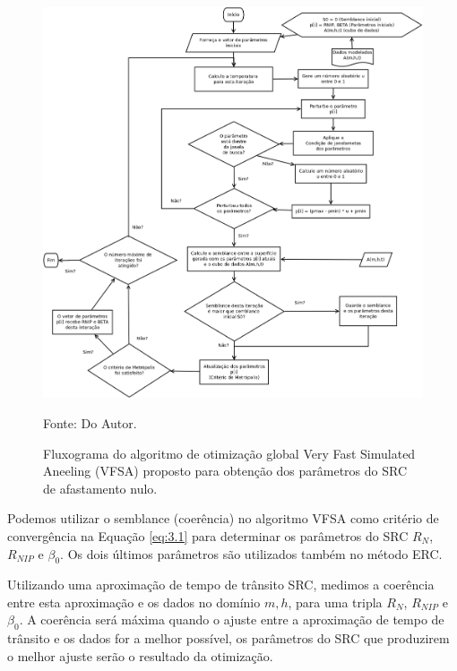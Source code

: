 \begin{figure}[htb]
\caption{Fluxograma do algoritmo de otimização global Very Fast Simulated Aneeling (VFSA)
proposto para obtenção dos parâmetros do SRC de afastamento nulo.}
\begin{center}
\includegraphics[scale=0.45]{images/VFSA.png}
\vspace{-0.3cm}
\end{center}
\begin{center}
 Fonte: Do Autor.
\end{center}
\label{fig:3.1}
\end{figure}

Podemos utilizar o semblance (coerência) no algoritmo VFSA como critério de convergência na Equação \ref{eq:3.1}
para determinar os parâmetros do SRC $R_N$, $R_{NIP}$ e $\beta_0$. Os dois últimos parâmetros são utilizados também 
no método ERC.

Utilizando uma aproximação de tempo de trânsito SRC, medimos a coerência entre esta aproximação e os
dados no domínio $m, h$, para uma tripla $R_N$, $R_{NIP}$ e $\beta_0$.
A coerência será máxima quando o ajuste entre a aproximação de tempo de trânsito e os dados
for a melhor possível, os parâmetros do SRC que produzirem o melhor ajuste serão o resultado da otimização.

